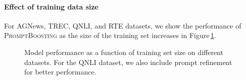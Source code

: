 \documentclass{article}
\theoremstyle{plain}
\theoremstyle{definition}
\theoremstyle{remark}
\newcommand{\alg}{\textsc{PromptBoosting}}
\begin{document}
\paragraph{Effect of training data size} For AGNews, TREC, QNLI, and RTE datasets, we show the performance of {\alg} as the size of the training set increases in Figure\,\ref{fig: appendix_training_size}.
\begin{figure}[h]
    \centering
    \hspace{-1mm}
    \hspace{-1mm}
    \hspace{-1mm}

    \caption{Model performance as a function of training set size on different datasets. For the QNLI dataset, we also include prompt refinement for better performance.}
\label{fig: appendix_training_size}
\vspace{-0.5em}
\end{figure}
\end{document}
